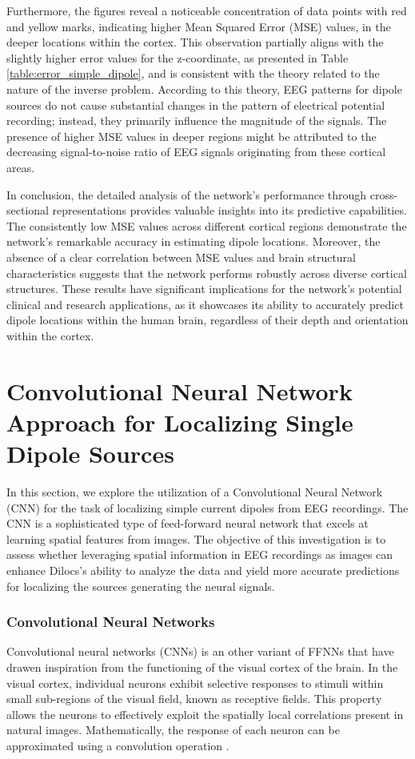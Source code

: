\documentclass[a4paper, UKenglish, 11pt]{uiomaster}
\begin{document}
Furthermore, the figures reveal a noticeable concentration of data points with red and yellow marks, indicating higher Mean Squared Error (MSE) values, in the deeper locations within the cortex. This observation partially aligns with the slightly higher error values for the z-coordinate, as presented in Table \ref{table:error_simple_dipole}, and is consistent with the theory related to the nature of the inverse problem. According to this theory, EEG patterns for dipole sources do not cause substantial changes in the pattern of electrical potential recording; instead, they primarily influence the magnitude of the signals. The presence of higher MSE values in deeper regions might be attributed to the decreasing signal-to-noise ratio of EEG signals originating from these cortical areas.

In conclusion, the detailed analysis of the network's performance through cross-sectional representations provides valuable insights into its predictive capabilities. The consistently low MSE values across different cortical regions demonstrate the network's remarkable accuracy in estimating dipole locations. Moreover, the absence of a clear correlation between MSE values and brain structural characteristics suggests that the network performs robustly across diverse cortical structures. These results have significant implications for the network's potential clinical and research applications, as it showcases its ability to accurately predict dipole locations within the human brain, regardless of their depth and orientation within the cortex.


\newpage

\section{Convolutional Neural Network Approach for Localizing Single Dipole Sources}

In this section, we explore the utilization of a Convolutional Neural Network (CNN) for the task of localizing simple current dipoles from EEG recordings. The CNN is a sophisticated type of feed-forward neural network that excels at learning spatial features from images. The objective of this investigation is to assess whether leveraging spatial information in EEG recordings as images can enhance Dilocs's ability to analyze the data and yield more accurate predictions for localizing the sources generating the neural signals.

\subsubsection{Convolutional Neural Networks}
Convolutional neural networks (CNNs) is an other variant of FFNNs that have drawen inspiration from the functioning of the visual cortex of the brain. In the visual cortex, individual neurons exhibit selective responses to stimuli within small sub-regions of the visual field, known as receptive fields. This property allows the neurons to effectively exploit the spatially local correlations present in natural images. Mathematically, the response of each neuron can be approximated using a convolution operation \cite{Hjorth-Jensen2022}.
\end{document}
